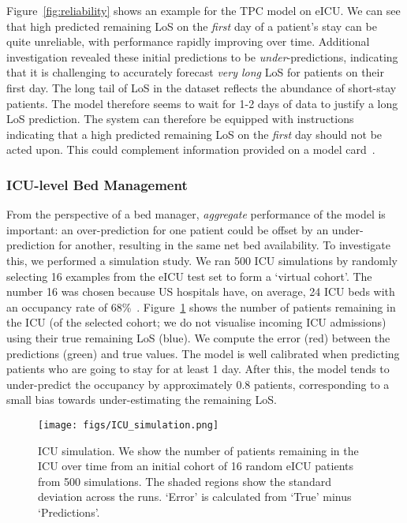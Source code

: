 \documentclass[sigconf]{acmart}
\begin{document}
Figure~\ref{fig:reliability} shows an example for the TPC model on eICU. We can see that high predicted remaining LoS on the \emph{first} day of a patient's stay can be quite unreliable, with performance rapidly improving over time. Additional investigation revealed these initial predictions to be \emph{under}-predictions, indicating that it is challenging to accurately forecast \emph{very long} LoS for patients on their first day. The long tail of LoS in the dataset reflects the abundance of short-stay patients. The model therefore seems to wait for 1-2 days of data to justify a long LoS prediction. The system can therefore be equipped with instructions indicating that a high predicted remaining LoS on the \emph{first} day should not be acted upon. This could complement information provided on a model card~\cite{Mitchell2019ModelCF,Sendak2020}.

\subsubsection{ICU-level Bed Management}
From the perspective of a bed manager, \emph{aggregate} performance of the model is important: an over-prediction for one patient could be offset by an under-prediction for another, resulting in the same net bed availability. To investigate this, we performed a simulation study. We ran 500 ICU simulations by randomly selecting 16 examples from the eICU test set to form a `virtual cohort'. The number 16 was chosen because US hospitals have, on average, 24 ICU beds \citep{doi:10.1164/rccm.201409-1746OC} with an occupancy rate of 68\%~\citep{Halpern2015}. Figure~\ref{fig:icusim} shows the number of patients remaining in the ICU (of the selected cohort; we do not visualise incoming ICU admissions) using their true remaining LoS (blue). We compute the error (red) between the predictions (green) and true values. The model is well calibrated when predicting patients who are going to stay for at least 1 day. After this, the model tends to under-predict the occupancy by approximately 0.8 patients, corresponding to a small bias towards under-estimating the remaining LoS. 

\begin{figure}[h]
  \centering
  \texttt{[image: figs/ICU\_simulation.png]}
  \caption{ICU simulation. We show the number of patients remaining in the ICU over time from an initial cohort of 16 random eICU patients from 500 simulations. The shaded regions show the standard deviation across the runs. `Error' is calculated from `True' minus `Predictions'.}
\label{fig:icusim}
\end{figure}
\end{document}
